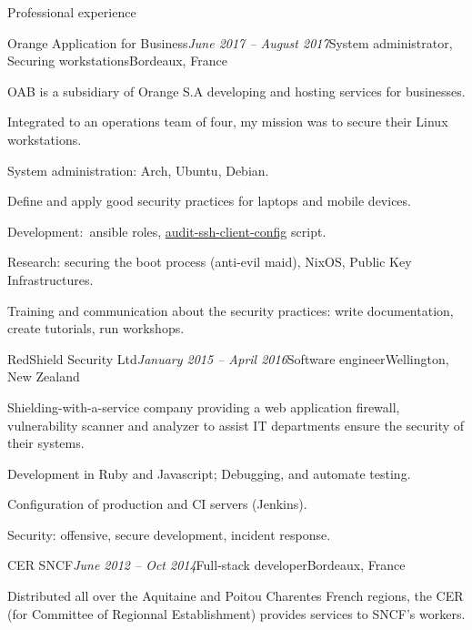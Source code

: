 \begin{rSection}{Professional experience}

  \begin{rSubsection}{Orange Application for Business}{\em June 2017 -- August 2017}{System administrator, Securing workstations}{Bordeaux, France}
    \item[]
      OAB is a subsidiary of Orange S.A developing and hosting services for businesses.
    \item[]
      Integrated to an operations team of four, my mission was to secure their Linux workstations.

    \item System administration: Arch, Ubuntu, Debian.
    \item Define and apply good security practices for laptops and mobile devices.
    \item Development: ansible roles, \href{https://github.com/multimediabs/audit-ssh-client-config}{audit-ssh-client-config} script.
    \item Research: securing the boot process (anti-evil maid), NixOS, Public Key Infrastructures.
    \item Training and communication about the security practices: write documentation, create tutorials, run workshops.
  \end{rSubsection}


  \begin{rSubsection}{RedShield Security Ltd}{\em January 2015 -- April 2016}{Software engineer}{Wellington, New Zealand}
    \item[]
      Shielding-with-a-service company providing a web application firewall, vulnerability scanner and analyzer to assist IT departments ensure the security of their systems.

    \item Development in Ruby and Javascript; Debugging, and automate testing.
    \item Configuration of production and CI servers (Jenkins).
    \item Security: offensive, secure development, incident response.
  \end{rSubsection}


  \begin{rSubsection}{CER SNCF}{\em June 2012 -- Oct 2014}{Full-stack developer}{Bordeaux, France}
    \item[] Distributed all over the Aquitaine and Poitou Charentes French regions, the CER (for Committee of Regionnal Establishment) provides services to SNCF's workers.


\end{rSubsection}
\end{rSection}
